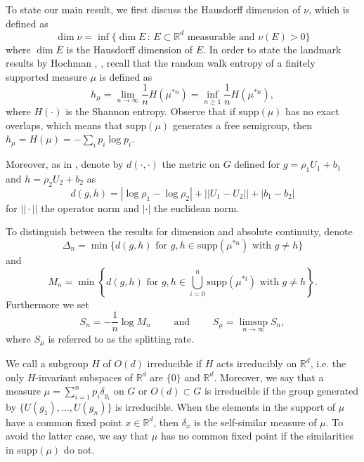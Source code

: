 \documentclass[10pt, english,oneside,reqno]{amsart}
\theoremstyle{plain}
\theoremstyle{remark}
\numberwithin{equation}{section}
\numberwithin{figure}{section}
\newcommand{\R}{\mathbb{R}}
\begin{document}
    To state our main result, we first discuss the Hausdorff dimension of $\nu$, which is defined as $$\dim \nu = \inf\{ \dim E \,:\, E \subset \R^d \text{ measurable and } \nu(E) > 0 \}$$ where $\dim E$ is the Hausdorff dimension of $E$. In order to state the landmark results by Hochman \cite{Hochman2014}, \cite{Hochman2017}, recall that the random walk entropy of a finitely supported measure $\mu$ is defined as  
    \begin{equation}\label{Def:RWEntropy}
        h_{\mu} = \lim_{n \to \infty} \frac{1}{n}H(\mu^{*n}) = \inf_{n \geq 1} \frac{1}{n}H(\mu^{*n}),
    \end{equation}
    where $H(\cdot)$ is the Shannon entropy. Observe that if $\mathrm{supp}(\mu)$ has no exact overlaps, which means that $\mathrm{supp}(\mu)$ generates a free semigroup, then $h_{\mu} = H(\mu) = -\sum_i p_i\log p_i.$ 
    
    Moreover, as in \cite{Hochman2017}, denote by $d(\cdot,\cdot)$ the metric on $G$ defined for $g = \rho_1U_1 + b_1$ and $h = \rho_2U_2 + b_2$ as $$d(g,h) = |\log \rho_1 - \log \rho_2| + ||U_1 - U_2|| + |b_1 - b_2|$$ for $||\cdot||$ the operator norm and $|\cdot|$ the euclidean norm.
    
    To distinguish between the results for dimension and absolute continuity, denote $$\Delta_n = \min\{ d(g, h) \text{ for } g, h \in \mathrm{supp}(\mu^{*n}) \text{ with } g \neq h  \}  $$ and $$M_n = \min\left\{ d(g, h) \text{ for } g, h \in \bigcup_{i = 0}^n \mathrm{supp}(\mu^{*i}) \text{ with } g \neq h  \right\}.$$ Furthermore we set 
    \begin{equation}\label{Def:SepRate}
        S_n = - \frac{1}{n} \log M_n \quad\quad \text{ and } \quad\quad S_{\mu} = \limsup_{n \to \infty} S_n,
    \end{equation}
    where $S_{\mu}$ is referred to as the splitting rate.
    
    We call a subgroup $H$ of $O(d)$ irreducible if $H$ acts irreducibly on $\R^d$, i.e. the only $H$-invariant subspaces of $\R^d$ are $\{ 0 \}$ and $\R^d$. Moreover, we say that a measure $\mu = \sum_{i = 1}^n p_i \delta_{g_i}$ on $G$ or $O(d) \subset G$ is irreducible if the group generated by $\{ U(g_1), \ldots , U(g_n) \}$ is irreducible. When the elements in the support of $\mu$ have a common fixed point $x \in \R^d$, then $\delta_x$ is the self-similar measure of $\mu$. To avoid the latter case, we say that $\mu$ has no common fixed point if the similarities in $\mathrm{supp}(\mu)$ do not. 
    
\end{document}
